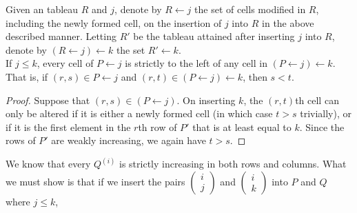 	\begin{flem}
		Given an tableau $R$ and $j$, denote by $R \leftarrow j$ the set of cells modified in $R$, including the newly formed cell, on the insertion of $j$ into $R$ in the above described manner. Letting $R'$ be the tableau attained after inserting $j$ into $R$, denote by $(R \leftarrow j) \leftarrow k$ the set $R' \leftarrow k$.\\
		If $j \le k$, every cell of $P \leftarrow j$ is strictly to the left of any cell in $(P \leftarrow j) \leftarrow k$. That is, if $(r,s) \in P\leftarrow j$ and $(r,t) \in (P \leftarrow j) \leftarrow k$, then $s < t$.
	\end{flem}
	\begin{proof}
		Suppose that $(r,s) \in (P \leftarrow j)$. On inserting $k$, the $(r,t)$th cell can only be altered if it is either a newly formed cell (in which case $t>s$ trivially), or if it is the first element in the $r$th row of $P'$ that is at least equal to $k$. Since the rows of $P'$ are weakly increasing, we again have $t>s$.
	\end{proof}


	We know that every $Q^{(i)}$ is strictly increasing in both rows and columns. What we must show is that if we insert the pairs $\begin{pmatrix} i \\ j \end{pmatrix}$ and $\begin{pmatrix} i \\ k \end{pmatrix}$ into $P$ and $Q$ where $j \le k$, 

